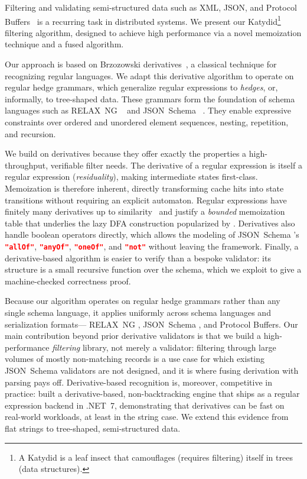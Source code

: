\documentclass[acmsmall,%
  screen,%
  authorversion, %
  nonacm%
]{acmart}
\newcommand{\RelaxNG}{%
  RELAX~NG\xspace%
}
\newcommand{\JSONSchema}{%
  JSON~Schema\xspace%
}
\newcommand{\DFA}{\ac{DFA}\xspace}
\newcommand{\JSON}{\ac{JSON}\xspace}
\newcommand{\XML}{\ac{XML}\xspace}
\begin{document}
Filtering and validating semi-structured data such as \XML, \JSON, and Protocol Buffers~\cite{protobuf} is a recurring task in distributed systems.
We present our Katydid\footnote{A Katydid is a leaf insect that camouflages (requires filtering) itself in trees (data structures).} filtering algorithm, designed to achieve high performance via a novel memoization technique and a fused algorithm.

Our approach is based on Brzozowski derivatives~\cite{brzozowski1964derivatives}, a classical technique for recognizing regular languages.
We adapt this derivative algorithm to operate on regular hedge grammars, which generalize regular expressions to \emph{hedges}, or, informally, to tree-shaped data. 
These grammars form the foundation of schema languages such as \RelaxNG~\cite{hosoya2010foundations} and \JSONSchema~\cite{jsonschemafoundations}.
They enable expressive constraints over ordered and unordered element sequences, nesting, repetition, and recursion.

We build on derivatives because they offer exactly the properties a high-throughput, verifiable filter needs.
The derivative of a regular expression is itself a regular expression (\emph{residuality}), making intermediate states first-class. Memoization is therefore inherent, directly transforming cache hits into state transitions without requiring an explicit automaton.
Regular expressions have finitely many derivatives up to similarity~\cite{brzozowski1964derivatives, symbolicfinite} and justify a \emph{bounded} memoization table that underlies the lazy \DFA construction popularized by \citet{reexamined}.
Derivatives also handle boolean operators directly, which allows the modeling of \JSONSchema's \lstinline[language=json]|"allOf"|, \lstinline[language=json]|"anyOf"|, \lstinline[language=json]|"oneOf"|, and \lstinline[language=json]|"not"| without leaving the framework.
Finally, a derivative-based algorithm is easier to verify than a bespoke validator: its structure is a small recursive function over the schema, which we exploit to give a machine-checked correctness proof.

Because our algorithm operates on regular hedge grammars rather than any single schema language, it applies uniformly across schema languages and serialization formats—\RelaxNG, \JSONSchema, and Protocol Buffers.
Our main contribution beyond prior derivative validators is that we build a high-performance \emph{filtering} library, not merely a validator: filtering through large volumes of mostly non-matching records is a use case for which existing \JSONSchema validators are not designed, and it is where fusing derivation with parsing pays off.
Derivative-based recognition is, moreover, competitive in practice: \citet{nonbacktracking} built a derivative-based, non-backtracking engine that ships as a regular expression backend in .NET~7, demonstrating that derivatives can be fast on real-world workloads, at least in the string case.
We extend this evidence from flat strings to tree-shaped, semi-structured data.
\end{document}
